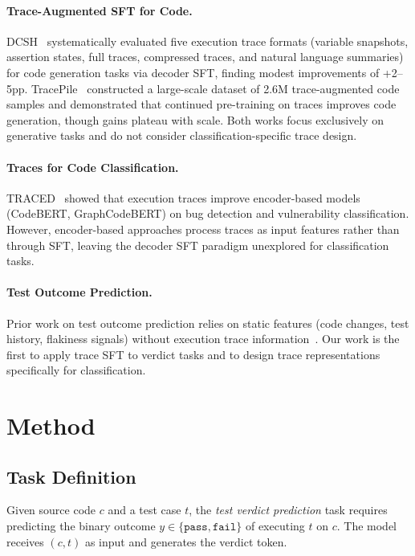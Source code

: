 \documentclass[11pt,a4paper]{article}
\begin{document}
\paragraph{Trace-Augmented SFT for Code.}
DCSH~\cite{dcsh2025} systematically evaluated five execution trace formats (variable snapshots, assertion states, full traces, compressed traces, and natural language summaries) for code generation tasks via decoder SFT, finding modest improvements of +2--5pp. TracePile~\cite{tracepile2025} constructed a large-scale dataset of 2.6M trace-augmented code samples and demonstrated that continued pre-training on traces improves code generation, though gains plateau with scale. Both works focus exclusively on generative tasks and do not consider classification-specific trace design.

\paragraph{Traces for Code Classification.}
TRACED~\cite{traced2024} showed that execution traces improve encoder-based models (CodeBERT, GraphCodeBERT) on bug detection and vulnerability classification. However, encoder-based approaches process traces as input features rather than through SFT, leaving the decoder SFT paradigm unexplored for classification tasks.

\paragraph{Test Outcome Prediction.}
Prior work on test outcome prediction relies on static features (code changes, test history, flakiness signals) without execution trace information~\cite{testpred2023}. Our work is the first to apply trace SFT to verdict tasks and to design trace representations specifically for classification.

\section{Method}

\subsection{Task Definition}

Given source code $c$ and a test case $t$, the \emph{test verdict prediction} task requires predicting the binary outcome $y \in \{\texttt{pass}, \texttt{fail}\}$ of executing $t$ on $c$. The model receives $(c, t)$ as input and generates the verdict token.
\end{document}

